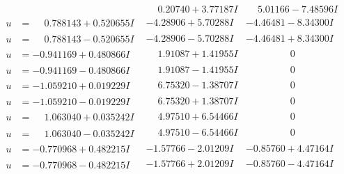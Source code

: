 \documentclass[1p]{elsarticle_modified}
\theoremstyle{definition}
\begin{document}
$$\begin{array}{c|c|c}
 & \phantom{-}0.20740 + 3.77187 I & \phantom{-}5.01166 - 7.48596 I \\ \hline\begin{aligned}
u &= \phantom{-}0.788143 + 0.520655 I\end{aligned}
 & -4.28906 + 5.70288 I & -4.46481 - 8.34300 I \\ \hline\begin{aligned}
u &= \phantom{-}0.788143 - 0.520655 I\end{aligned}
 & -4.28906 - 5.70288 I & -4.46481 + 8.34300 I \\ \hline\begin{aligned}
u &= -0.941169 + 0.480866 I\end{aligned}
 & \phantom{-}1.91087 + 1.41955 I & \phantom{-0.000000 } 0 \\ \hline\begin{aligned}
u &= -0.941169 - 0.480866 I\end{aligned}
 & \phantom{-}1.91087 - 1.41955 I & \phantom{-0.000000 } 0 \\ \hline\begin{aligned}
u &= -1.059210 + 0.019229 I\end{aligned}
 & \phantom{-}6.75320 - 1.38707 I & \phantom{-0.000000 } 0 \\ \hline\begin{aligned}
u &= -1.059210 - 0.019229 I\end{aligned}
 & \phantom{-}6.75320 + 1.38707 I & \phantom{-0.000000 } 0 \\ \hline\begin{aligned}
u &= \phantom{-}1.063040 + 0.035242 I\end{aligned}
 & \phantom{-}4.97510 + 6.54466 I & \phantom{-0.000000 } 0 \\ \hline\begin{aligned}
u &= \phantom{-}1.063040 - 0.035242 I\end{aligned}
 & \phantom{-}4.97510 - 6.54466 I & \phantom{-0.000000 } 0 \\ \hline\begin{aligned}
u &= -0.770968 + 0.482215 I\end{aligned}
 & -1.57766 - 2.01209 I & -0.85760 + 4.47164 I \\ \hline\begin{aligned}
u &= -0.770968 - 0.482215 I\end{aligned}
 & -1.57766 + 2.01209 I & -0.85760 - 4.47164 I \\ \hline\begin{aligned}

\end{aligned}
\end{array}$$
\end{document}
